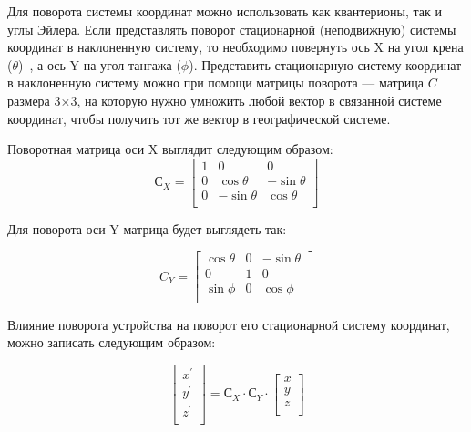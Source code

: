 Для поворота системы координат можно использовать как квантерионы, так и углы Эйлера.
Если представлять поворот стационарной (неподвижную) системы координат в наклоненную систему, то
необходимо повернуть ось X на угол крена ($\theta$)~, а ось Y на угол тангажа ($\phi$).
Представить стационарную систему координат в наклоненную систему можно при помощи матрицы поворота ---
матрица $C$ размера 3×3, на которую нужно умножить любой вектор в связанной системе координат, 
чтобы получить тот же вектор в географической системе.

Поворотная матрица оси X выглядит следующим образом:
\begin{equation}
    \label{eq:domain:rotateXmat}
    С_X = \begin{bmatrix} 1 & 0 & 0 \\ 
        0 & \cos{\theta} & -\sin{\theta} \\ 
        0 & -\sin{\theta} & \cos{\theta} \\ 
        \end{bmatrix}
    \end{equation}

Для поворота оси Y матрица будет выглядеть так:

\begin{equation}
    \label{eq:domain:rotatYmat}
    C_Y = \begin{bmatrix} \cos{\theta} & 0 & -\sin{\theta} \\ 
        0 & 1 & 0 \\ 
        \sin{\phi} & 0 & \cos{\phi} \\ 
    \end{bmatrix}
    \end{equation} 

Влияние поворота устройства на поворот его стационарной систему координат,
можно записать следующим образом:

\begin{equation}
    \label{eq:domain:magnetTilt}
    \begin{bmatrix} x^{'} \\ y^{'} \\ z^{'} \\ \end{bmatrix} = 
            С_X \cdot С_Y \cdot \begin{bmatrix} x \\ y \\ z \\ \end{bmatrix}
    \end{equation} 

